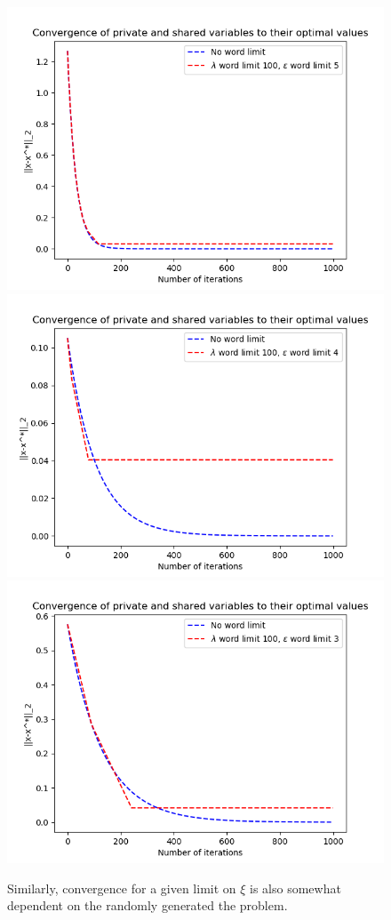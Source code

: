 \documentclass[12pt]{article}
\begin{document}
\begin{figure}[H]
	\centering
	\includegraphics[scale=0.5]{Problem4-Convergence8.png}
	\includegraphics[scale=0.5]{Problem4-Convergence9.png}
	\includegraphics[scale=0.5]{Problem4-Convergence10.png}
	\caption{Similarly, convergence for a given limit on $\xi$ is also somewhat dependent on the randomly generated the problem.}
\end{figure}
\end{document}
